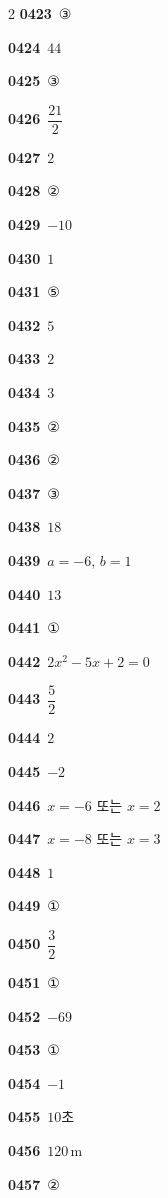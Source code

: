 \documentclass[10pt,a4paper]{article}
\begin{document}
\begin{multicols}{2}
\noindent\textbf{0423}\ ③\par
\noindent\textbf{0424}\ $44$\par
\noindent\textbf{0425}\ ③\par
\noindent\textbf{0426}\ $\dfrac{21}{2}$\par
\noindent\textbf{0427}\ $2$\par
\noindent\textbf{0428}\ ②\par
\noindent\textbf{0429}\ $-10$\par
\noindent\textbf{0430}\ $1$\par
\noindent\textbf{0431}\ ⑤\par
\noindent\textbf{0432}\ $5$\par
\noindent\textbf{0433}\ $2$\par
\noindent\textbf{0434}\ $3$\par
\noindent\textbf{0435}\ ②\par
\noindent\textbf{0436}\ ②\par
\noindent\textbf{0437}\ ③\par
\noindent\textbf{0438}\ $18$\par
\noindent\textbf{0439}\ $a=-6$, $b=1$\par
\noindent\textbf{0440}\ $13$\par
\noindent\textbf{0441}\ ①\par
\noindent\textbf{0442}\ $2x^2-5x+2=0$\par
\noindent\textbf{0443}\ $\dfrac{5}{2}$\par
\noindent\textbf{0444}\ $2$\par
\noindent\textbf{0445}\ $-2$\par
\noindent\textbf{0446}\ $x=-6$ 또는 $x=2$\par
\noindent\textbf{0447}\ $x=-8$ 또는 $x=3$\par
\noindent\textbf{0448}\ $1$\par
\noindent\textbf{0449}\ ①\par
\noindent\textbf{0450}\ $\dfrac{3}{2}$\par
\noindent\textbf{0451}\ ①\par
\noindent\textbf{0452}\ $-69$\par
\noindent\textbf{0453}\ ①\par
\noindent\textbf{0454}\ $-1$\par
\noindent\textbf{0455}\ $10$초\par
\noindent\textbf{0456}\ $120\,\mathrm{m}$\par
\noindent\textbf{0457}\ ②\par

\end{multicols}
\end{document}
